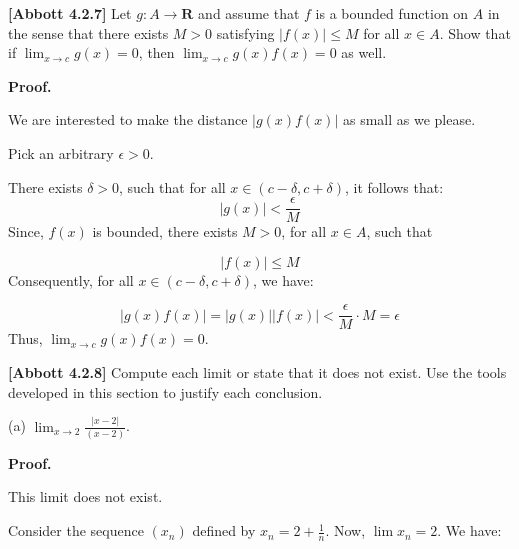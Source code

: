 \documentclass[10pt]{article}
\begin{document}
\textbf{[Abbott 4.2.7] }Let $\displaystyle g:A\rightarrow \mathbf{R}$ and assume that $\displaystyle f$ is a bounded function on $\displaystyle A$ in the sense that there exists $\displaystyle M >0$ satisfying $\displaystyle |f( x) |\leq M$ for all $\displaystyle x\in A$. Show that if $\displaystyle \lim _{x\rightarrow c} g( x) =0$, then $\displaystyle \lim _{x\rightarrow c} g( x) f( x) =0$ as well.



\textbf{Proof.}



We are interested to make the distance $\displaystyle |g( x) f( x) |$ as small as we please.



Pick an arbitrary $\displaystyle \epsilon  >0$. 



There exists $\displaystyle \delta  >0$, such that for all $\displaystyle x\in ( c-\delta ,c+\delta )$, it follows that:
\begin{equation*}
| g( x) |< \frac{\epsilon }{M}
\end{equation*}
Since, $\displaystyle f( x)$ is bounded, there exists $\displaystyle M >0$, for all $\displaystyle x\in A$, such that


\begin{equation*}
|f( x) |\leq M
\end{equation*}
Consequently, for all $\displaystyle x\in ( c-\delta ,c+\delta )$, we have:


\begin{equation*}
|g( x) f( x) |=|g( x) ||f( x) |< \frac{\epsilon }{M} \cdot M=\epsilon 
\end{equation*}
Thus, $\displaystyle \lim _{x\rightarrow c} g( x) f( x) =0$.



\textbf{[Abbott 4.2.8]} Compute each limit or state that it does not exist. Use the tools developed in this section to justify each conclusion.



(a) $\displaystyle \lim _{x\rightarrow 2}\frac{|x-2|}{( x-2)}$.



\textbf{Proof.}



This limit does not exist.

Consider the sequence $\displaystyle ( x_{n})$ defined by $\displaystyle x_{n} =2+\frac{1}{n}$. Now, $\displaystyle \lim x_{n} =2$. We have:
\end{document}
